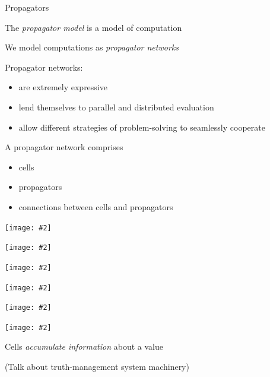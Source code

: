 \documentclass[usenames,dvipsnames,svgnames,table,aspectratio=1610,mathserif]{beamer}
\newcommand{\nl}{\vspace{\baselineskip}}
\newcommand{\pnl}{\pause \nl}
\newcommand{\textslide}[1]{{
\begin{frame}
\begin{center}

#1

\end{center}
\end{frame}
}}
\newcommand{\imageslide}[2][1]{{
\begin{frame}\begin{center}
\texttt{[image: \#2]}
\end{center}\end{frame}
}}
\begin{document}


\begin{frame}

\begin{center}
{\Huge Propagators}
\end{center}

\end{frame}


\begin{frame}
The {\it propagator model} is a model of computation

We model computations as {\it propagator networks}

\pnl

Propagator networks:
\begin{itemize}
\item are extremely expressive
\item lend themselves to parallel and distributed evaluation
\item allow different strategies of problem-solving to seamlessly cooperate
\end{itemize}
\end{frame}


\begin{frame}

A propagator network comprises
\begin{itemize}
\item cells
\item propagators
\item connections between cells and propagators
\end{itemize}

\end{frame}


\imageslide{cell1.pdf}
\imageslide{cell2.pdf}
\imageslide{prop.pdf}

\imageslide{upper1.pdf}
\imageslide{upper2.pdf}
\imageslide{upper3.pdf}





\textslide{\Large{Cells {\it accumulate information} about a value}}









\textslide{(Talk about truth-management system machinery)}
\end{document}

